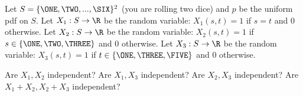   Let $S = \{ \ONE, \TWO, ..., \SIX \}^2$ (you are rolling two dice)
  and $p$ be the uniform pdf on $S$.
  Let $X_1 : S \rightarrow  \R$ be the random variable:
  $X_1(s, t) = 1$ if $s = t$ and $0$ otherwise.
  Let $X_2 : S \rightarrow  \R$ be the random variable:
  $X_2(s, t) = 1$ if $s \in \{\ONE, \TWO, \THREE\}$ and $0$ otherwise.
  Let $X_3 : S \rightarrow  \R$ be the random variable:
  $X_3(s, t) = 1$ if $t \in \{\ONE, \THREE, \FIVE\}$ and $0$ otherwise.
  \begin{itemize}
    \li Are $X_1, X_2$ independent?
    \li Are $X_1, X_3$ independent?
    \li Are $X_2, X_3$ independent?
    \li Are $X_1 + X_2, X_2 + X_3$ independent?
  \end{itemize}
